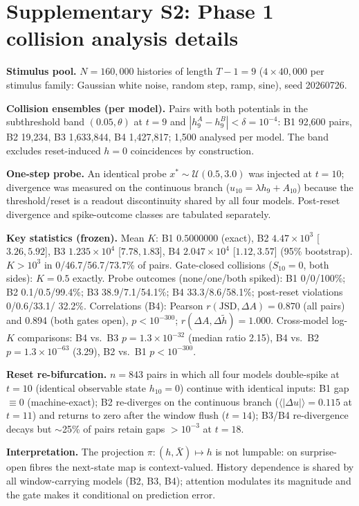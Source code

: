 \section{Supplementary S2: Phase 1 collision analysis details}

\textbf{Stimulus pool.} $N = 160{,}000$ histories of length $T-1 = 9$
($4\times40{,}000$ per stimulus family: Gaussian white noise, random
step, ramp, sine), seed 20260726.

\textbf{Collision ensembles (per model).} Pairs with both potentials in
the subthreshold band $(0.05,\theta)$ at $t=9$ and
$|h_9^A - h_9^B| < \delta = 10^{-4}$: B1 92{,}600 pairs, B2 19{,}234,
B3 1{,}633{,}844, B4 1{,}427{,}817; 1{,}500 analysed per model.  The
band excludes reset-induced $h=0$ coincidences by construction.

\textbf{One-step probe.} An identical probe
$x^*\sim\mathcal{U}(0.5,3.0)$ was injected at $t=10$; divergence was
measured on the continuous branch ($u_{10} = \lambda h_9 + A_{10}$)
because the threshold/reset is a readout discontinuity shared by all
four models.  Post-reset divergence and spike-outcome classes are
tabulated separately.

\textbf{Key statistics (frozen).} Mean $K$: B1 $0.5000000$ (exact),
B2 $4.47\times10^3$ [$3.26,5.92$], B3 $1.235\times10^4$
[$7.78,1.83$], B4 $2.047\times10^4$ [$1.12,3.57$] (95\% bootstrap).
$K>10^3$ in 0/46.7/56.7/73.7\% of pairs.  Gate-closed collisions
($S_{10}=0$, both sides): $K = 0.5$ exactly.  Probe outcomes
(none/one/both spiked): B1 0/0/100\%; B2 0.1/0.5/99.4\%; B3
38.9/7.1/54.1\%; B4 33.3/8.6/58.1\%; post-reset violations 0/0.6/33.1/
32.2\%.  Correlations (B4): Pearson $r(\mathrm{JSD},\Delta A)=0.870$
(all pairs) and 0.894 (both gates open), $p<10^{-300}$;
$r(\Delta A,\Delta\tilde h)=1.000$.  Cross-model log-$K$ comparisons:
B4 vs.\ B3 $p=1.3\times10^{-32}$ (median ratio 2.15), B4 vs.\ B2
$p=1.3\times10^{-63}$ (3.29), B2 vs.\ B1 $p<10^{-300}$.

\textbf{Reset re-bifurcation.} $n=843$ pairs in which all four models
double-spike at $t=10$ (identical observable state $h_{10}=0$) continue
with identical inputs: B1 gap $\equiv 0$ (machine-exact); B2 re-diverges
on the continuous branch ($\langle|\Delta u|\rangle = 0.115$ at
$t=11$) and returns to zero after the window flush ($t=14$); B3/B4
re-divergence decays but $\sim$25\% of pairs retain gaps $>10^{-3}$ at
$t=18$.

\textbf{Interpretation.} The projection $\pi:(h,\bar X)\mapsto h$ is not
lumpable: on surprise-open fibres the next-state map is context-valued.
History dependence is shared by all window-carrying models (B2, B3, B4);
attention modulates its magnitude and the gate makes it conditional on
prediction error.
